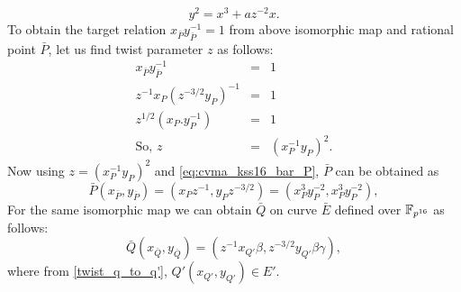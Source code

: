 \begin{equation}\label{eq:cvma_kss16_isomorphic_E_bar}
y^2 = x^3+az^{-2}x.
\end{equation}
To obtain the target relation $x_{\bar P}y_{\bar P}^{-1} = 1$ from  above isomorphic map and rational point $\bar P$, let us find twist parameter $z$ as follows:
\begin{eqnarray}
x_{\bar P}y_{\bar P}^{-1}& =& 1 \nonumber \\
z^{-1}x_P (z^{-3/2}y_P)^{-1} &=& 1 \nonumber \\
z^{1/2}(x_P.y_P^{-1})&=&1\nonumber \\
\text{So, } z &= &(x_P^{-1}y_P)^2.
\end{eqnarray}
Now using $z = (x_P^{-1}y_P)^2$ and \eqref{eq:cvma_kss16_bar_P}, $\bar P$ can be obtained as
\begin{equation}
\bar{P}(x_{\bar{P}}, y_{\bar{P}})= (x_P z^{-1},y_P z^{-3/2})=(x_P^3y_P^{-2},x_P^3y_P^{-2}),
\end{equation}
For the same isomorphic map we can obtain $\bar{Q}$ on curve $\bar{E}$ defined over $\mathbb{F}_{p^{16}}$ as follows:
\begin{equation} \label{eq:cvma_kss16_Q_bar}
\bar{Q}(x_{\bar{Q}}, y_{\bar{Q}}) = (z^{-1}x_{Q'}\beta, z^{-3/2}y_{Q'}\beta\gamma),
\end{equation} 
where from \eqref{twist_q_to_q'}, $Q'(x_{Q'},y_{Q'}) \in E'$.%

